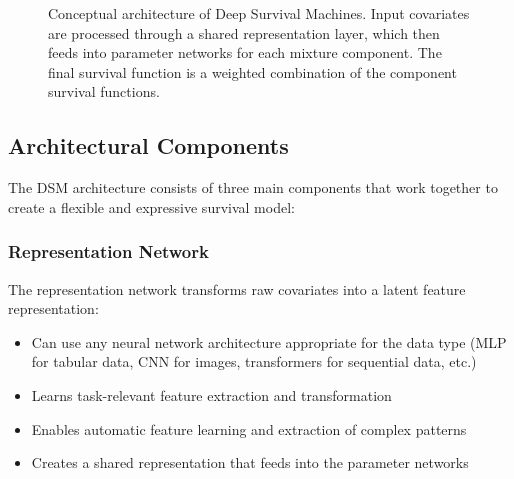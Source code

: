 \begin{figure}[htbp]
    \centering
    \caption{Conceptual architecture of Deep Survival Machines. Input covariates are processed through a shared representation layer, which then feeds into parameter networks for each mixture component. The final survival function is a weighted combination of the component survival functions.}
    \label{fig:dsm-architecture}
\end{figure}

\subsection{Architectural Components}

The DSM architecture consists of three main components that work together to create a flexible and expressive survival model:

\subsubsection{Representation Network}

The representation network transforms raw covariates into a latent feature representation:
\begin{itemize}
    \item Can use any neural network architecture appropriate for the data type (MLP for tabular data, CNN for images, transformers for sequential data, etc.)
    \item Learns task-relevant feature extraction and transformation
    \item Enables automatic feature learning and extraction of complex patterns
    \item Creates a shared representation that feeds into the parameter networks
\end{itemize}


